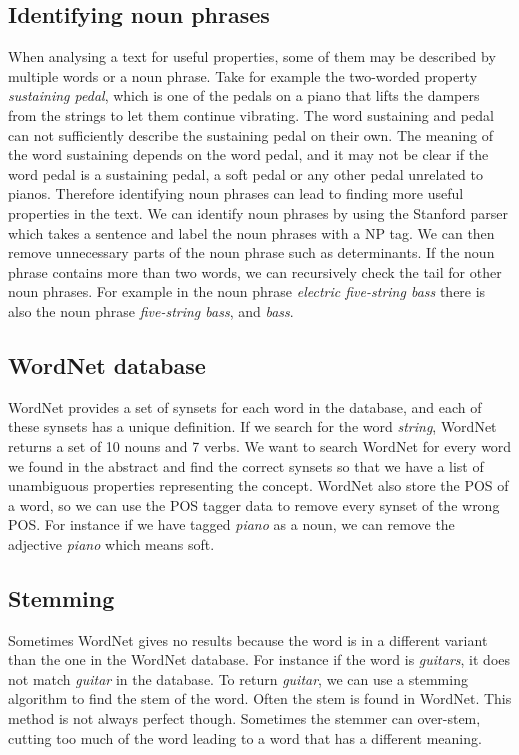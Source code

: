 \subsection{Identifying noun phrases}
When analysing a text for useful properties, some of them may be described by multiple words or a noun phrase. Take for example the two-worded property \emph{sustaining pedal}, which is one of the pedals on a piano that lifts the dampers from the strings to let them continue vibrating. The word sustaining and pedal can not sufficiently describe the sustaining pedal on their own. The meaning of the word sustaining depends on the word pedal, and it may not be clear if the word pedal is a sustaining pedal, a soft pedal or any other pedal unrelated to pianos. Therefore identifying noun phrases can lead to finding more useful properties in the text. We can identify noun phrases by using the Stanford parser which takes a sentence and label the noun phrases with a NP tag. We can then remove unnecessary parts of the noun phrase such as determinants. If the noun phrase contains more than two words, we can recursively check the tail for other noun phrases. For example in the noun phrase \emph{electric five-string bass} there is also the noun phrase \emph{five-string bass}, and \emph{bass}.


\subsection{WordNet database}
WordNet provides a set of synsets for each word in the database, and each of these synsets has a unique definition. If we search for the word \emph{string}, WordNet returns a set of 10 nouns and 7 verbs. We want to search WordNet for every word we found in the abstract and find the correct synsets so that we have a list of unambiguous properties representing the concept. WordNet also store the POS of a word, so we can use the POS tagger data to remove every synset of the wrong POS. For instance if we have tagged \emph{piano} as a noun, we can remove the adjective \emph{piano} which means soft.

\subsection{Stemming}
Sometimes WordNet gives no results because the word is in a different variant than the one in the WordNet database. For instance if the word is \emph{guitars}, it does not match \emph{guitar} in the database. To return \emph{guitar}, we can use a stemming algorithm to find the stem of the word. Often the stem is found in WordNet. This method is not always perfect though. Sometimes the stemmer can over-stem, cutting too much of the word leading to a word that has a different meaning. %

